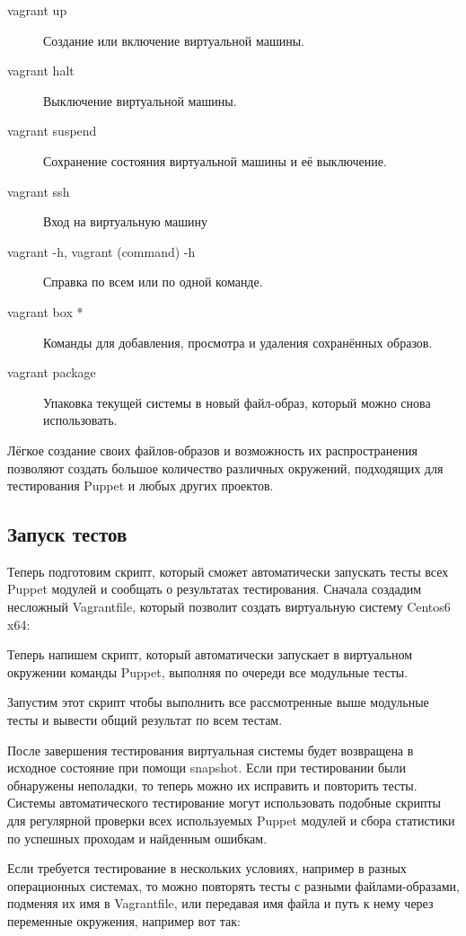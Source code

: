 \begin{description}
\item[vagrant up] Создание или включение виртуальной машины.
\item[vagrant halt] Выключение виртуальной машины.
\item[vagrant suspend] Сохранение состояния виртуальной машины и её выключение.
\item[vagrant ssh] Вход на виртуальную машину
\item[vagrant -h, vagrant (command) -h] Справка по всем или по одной команде.
\item[vagrant box *] Команды для добавления, просмотра и удаления сохранённых образов.
\item[vagrant package] Упаковка текущей системы в новый файл-образ, который можно снова использовать.
\end{description}

Лёгкое создание своих файлов-образов и возможность их распространения позволяют создать большое количество различных окружений, подходящих для тестирования Puppet и любых других проектов.

\subsection{Запуск тестов}

Теперь подготовим скрипт, который сможет автоматически запускать тесты всех Puppet модулей и сообщать о результатах тестирования. Сначала создадим несложный Vagrantfile, который позволит создать виртуальную систему Centos6 x64:


Теперь напишем скрипт, который автоматически запускает в виртуальном окружении команды Puppet, выполняя по очереди все модульные тесты.



Запустим этот скрипт чтобы выполнить все рассмотренные выше модульные тесты и вывести общий результат по всем тестам.


После завершения тестирования виртуальная системы будет возвращена в исходное состояние при помощи snapshot. Если при тестировании были обнаружены неполадки, то теперь можно их исправить и повторить тесты. Системы автоматического тестирование могут использовать подобные скрипты для регулярной проверки всех используемых Puppet модулей и сбора статистики по успешных проходам и найденным ошибкам.

Если требуется тестирование в нескольких условиях, например в разных операционных системах, то можно повторять тесты с разными файлами-образами, подменяя их имя в Vagrantfile, или передавая имя файла и путь к нему через переменные окружения, например вот так:


